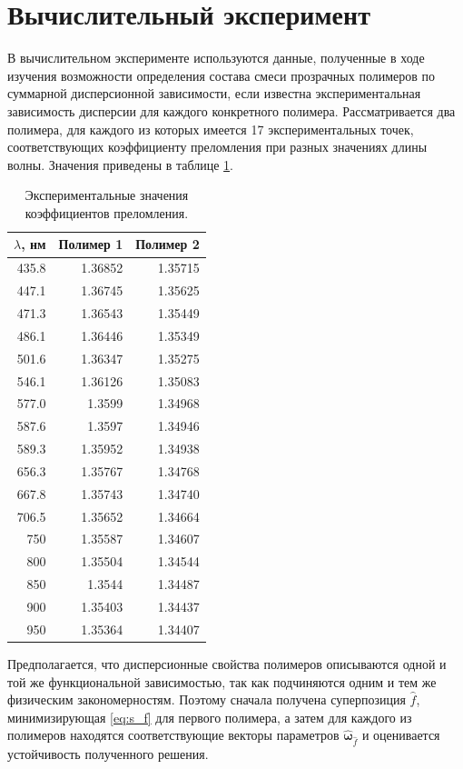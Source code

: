 \documentclass[11pt,a4paper]{article}
\theoremstyle{definition}
\begin{document}
\section{Вычислительный эксперимент}

В вычислительном эксперименте используются данные, полученные в ходе
изучения возможности определения состава смеси прозрачных
полимеров по суммарной дисперсионной зависимости, если известна экспериментальная
зависимость дисперсии для каждого конкретного полимера. Рассматривается два
полимера, для каждого из которых имеется 17 экспериментальных точек,
соответствующих коэффициенту преломления при разных значениях длины волны.
Значения приведены в таблице \ref{tabl:source_data}.

\begin{table}[h]
  \footnotesize
  \caption{Экспериментальные значения коэффициентов преломления.}
  \centering
  \begin{tabular}{r | r | r}
	$\lambda$, нм	& Полимер 1 & Полимер 2 \\ \hline
	435.8 & 1.36852 & 1.35715 \\
	447.1 & 1.36745 & 1.35625 \\
	471.3 & 1.36543 & 1.35449 \\
	486.1 & 1.36446 & 1.35349 \\
	501.6 & 1.36347 & 1.35275 \\
	546.1 & 1.36126 & 1.35083 \\
	577.0 & 1.3599 & 1.34968 \\
	587.6 & 1.3597 & 1.34946 \\
	589.3 & 1.35952 & 1.34938 \\
	656.3 & 1.35767 & 1.34768 \\
	667.8 & 1.35743 & 1.34740 \\
	706.5 & 1.35652 & 1.34664 \\
	750 & 1.35587 & 1.34607 \\
	800 & 1.35504 & 1.34544 \\
	850 & 1.3544 & 1.34487 \\
	900 & 1.35403 & 1.34437 \\
	950 & 1.35364 & 1.34407 \\
  \end{tabular}
  \label{tabl:source_data}
\end{table}

Предполагается, что дисперсионные свойства полимеров описываются одной и той
же функциональной зависимостью, так как подчиняются одним и тем же физическим
закономерностям. Поэтому сначала получена суперпозиция $\hat{f}$,
минимизирующая \eqref{eq:s_f} для первого полимера, а затем для каждого
из полимеров находятся соответствующие векторы параметров
$\hat{\boldsymbol{\omega}}_{\hat{f}}$ и оценивается устойчивость полученного решения.
\end{document}
